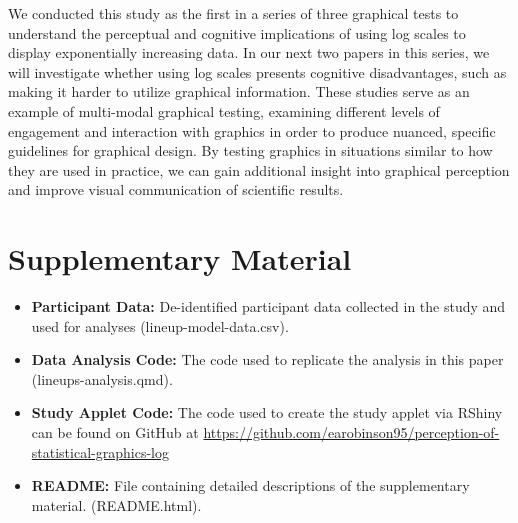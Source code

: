 \documentclass[12pt]{article}
\providecommand{\tightlist}{%
  \setlength{\itemsep}{0pt}\setlength{\parskip}{0pt}}
\begin{document}
We conducted this study as the first in a series of three graphical
tests to understand the perceptual and cognitive implications of using
log scales to display exponentially increasing data. In our next two
papers in this series, we will investigate whether using log scales
presents cognitive disadvantages, such as making it harder to utilize
graphical information. These studies serve as an example of multi-modal
graphical testing, examining different levels of engagement and
interaction with graphics in order to produce nuanced, specific
guidelines for graphical design. By testing graphics in situations
similar to how they are used in practice, we can gain additional insight
into graphical perception and improve visual communication of scientific
results.

\hypertarget{supplementary-material}{%
\section*{Supplementary Material}\label{supplementary-material}}

\begin{itemize}
\tightlist
\item
  \textbf{Participant Data:} De-identified participant data collected in
  the study and used for analyses (lineup-model-data.csv).
\item
  \textbf{Data Analysis Code:} The code used to replicate the analysis
  in this paper (lineups-analysis.qmd).
\item
  \textbf{Study Applet Code:} The code used to create the study applet
  via RShiny can be found on GitHub at
  \url{https://github.com/earobinson95/perception-of-statistical-graphics-log}
\item
  \textbf{README:} File containing detailed descriptions of the
  supplementary material. (README.html).
\end{itemize}



\end{document}
